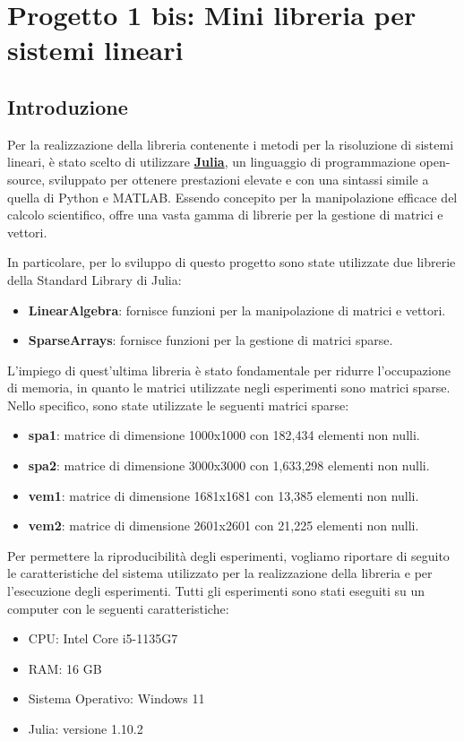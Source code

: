 \chapter{Progetto 1 bis: Mini libreria per sistemi lineari}
\section{Introduzione}
Per la realizzazione della libreria contenente i metodi per la risoluzione di
sistemi lineari, è stato scelto di utilizzare \href{https://julialang.org/}{\textbf{Julia}},
un linguaggio di programmazione open-source, sviluppato per ottenere prestazioni
elevate e con una sintassi simile a quella di Python e MATLAB. Essendo concepito
per la manipolazione efficace del calcolo scientifico, offre una vasta gamma di
librerie per la gestione di matrici e vettori.

In particolare, per lo sviluppo di questo progetto sono state utilizzate due
librerie della Standard Library di Julia:
\begin{itemize}
    \item \textbf{LinearAlgebra}: fornisce funzioni per la manipolazione di
          matrici e vettori.
    \item \textbf{SparseArrays}: fornisce funzioni per la gestione di matrici sparse.
\end{itemize}

L'impiego di quest'ultima libreria è stato fondamentale per ridurre l'occupazione
di memoria, in quanto le matrici utilizzate negli esperimenti sono matrici sparse.
Nello specifico, sono state utilizzate le seguenti matrici sparse:
\begin{itemize}
    \item \textbf{spa1}: matrice di dimensione 1000x1000 con 182,434 elementi non nulli.
    \item \textbf{spa2}: matrice di dimensione 3000x3000 con 1,633,298 elementi non nulli.
    \item \textbf{vem1}: matrice di dimensione 1681x1681 con 13,385 elementi non nulli.
    \item \textbf{vem2}: matrice di dimensione 2601x2601 con 21,225 elementi non nulli.
\end{itemize}

Per permettere la riproducibilità degli esperimenti, vogliamo riportare di seguito
le caratteristiche del sistema utilizzato per la realizzazione della libreria e
per l'esecuzione degli esperimenti. Tutti gli esperimenti sono stati eseguiti su
un computer con le seguenti caratteristiche:
\begin{itemize}
    \item CPU: Intel Core i5-1135G7
    \item RAM: 16 GB
    \item Sistema Operativo: Windows 11
    \item Julia: versione 1.10.2
\end{itemize}
